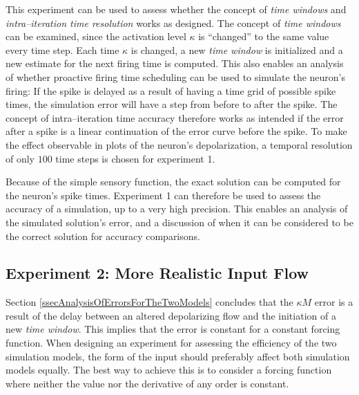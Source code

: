 	This experiment can be used to assess whether the concept of \emph{time windows} and \emph{intra--iteration time resolution} works as designed.
	The concept of \emph{time windows} can be examined, since the activation level $\kappa$ is ``changed'' to the same value every time step.
	Each time $\kappa$ is changed, a new \emph{time window} is initialized and a new estimate for the next firing time is computed.
	This also enables an analysis of whether proactive firing time scheduling can be used to simulate the neuron's firing: %
		If the spike is delayed as a result of having a time grid of possible spike times, the simulation error will have a step from before to after the spike.
	The concept of intra--iteration time accuracy therefore works as intended if the error after a spike is a linear continuation of the error curve before the spike.
	To make the effect observable in plots of the neuron's depolarization, a temporal resolution of only $100$ time steps is chosen for experiment 1.

	Because of the simple sensory function, the exact solution can be computed for the neuron's spike times.
	Experiment 1 can therefore be used to assess the accuracy of a simulation, up to a very high precision.
	This enables an analysis of the simulated solution's error, and a discussion of when it can be considered to be the correct solution for accuracy comparisons.


	\subsection{Experiment 2: More Realistic Input Flow}
	\label{ssecExperiment2Design}
	Section \ref{ssecAnalysisOfErrorsForTheTwoModels} concludes  that the $\kappa M$ error is a result of the delay between an altered depolarizing flow and the initiation of a new \emph{time window}. %
	This implies that the error is constant for a constant forcing function.
	When designing an experiment for assessing the efficiency of the two simulation models, the form of the input should preferably affect both simulation models equally. 
	The best way to achieve this is to consider a forcing function where neither the value nor the derivative of any order is constant.
 
